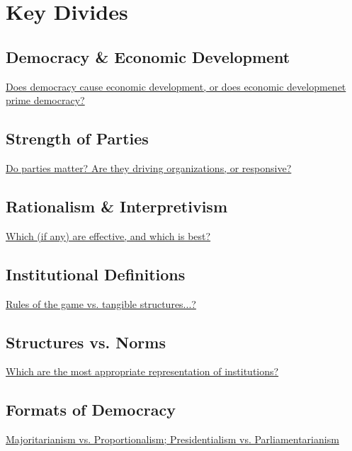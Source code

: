 \documentclass[12pt]{article}
\begin{document}
\section*{Key Divides}


\subsection*{Democracy \& Economic Development}
\underline{Does democracy cause economic development, or does economic developmenet prime democracy?}






\subsection*{Strength of Parties}
\underline{Do parties matter? Are they driving organizations, or responsive?}






\subsection*{Rationalism \& Interpretivism}
\underline{Which (if any) are effective, and which is best?}






\subsection*{Institutional Definitions}
\underline{Rules of the game vs. tangible structures...?}






\subsection*{Structures vs. Norms}
\underline{Which are the most appropriate representation of institutions?}






\subsection*{Formats of Democracy}
\underline{Majoritarianism vs. Proportionalism; Presidentialism vs. Parliamentarianism}
\end{document}
